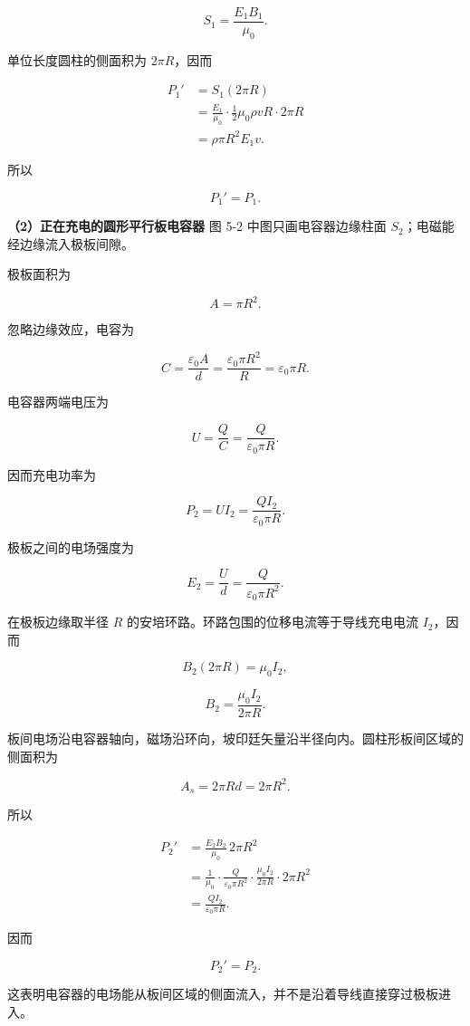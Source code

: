 \documentclass[12pt,a4paper,UTF8]{ctexart}
\begin{document}
\[S_1=\frac{E_1B_1}{\mu_0}.\]

单位长度圆柱的侧面积为 \(2\pi R\)，因而

\[\begin{aligned}
P_1'
&=S_1(2\pi R)\\
&=\frac{E_1}{\mu_0}\cdot\frac12\mu_0\rho vR\cdot2\pi R\\
&=\rho\pi R^2E_1v.
\end{aligned}\]

所以

\[\boxed{P_1'=P_1}.\]

\textbf{（2）正在充电的圆形平行板电容器} 图 5-2 中图只画电容器边缘柱面
\(S_2\)；电磁能经边缘流入极板间隙。

极板面积为

\[A=\pi R^2.\]

忽略边缘效应，电容为

\[C=\frac{\varepsilon_0A}{d}
=\frac{\varepsilon_0\pi R^2}{R}
=\varepsilon_0\pi R.\]

电容器两端电压为

\[U=\frac QC=\frac{Q}{\varepsilon_0\pi R}.\]

因而充电功率为

\[\boxed{P_2=UI_2=\frac{QI_2}{\varepsilon_0\pi R}}.\]

极板之间的电场强度为

\[E_2=\frac U d
=\frac{Q}{\varepsilon_0\pi R^2}.\]

在极板边缘取半径 \(R\) 的安培环路。环路包围的位移电流等于导线充电电流
\(I_2\)，因而

\[B_2(2\pi R)=\mu_0I_2,\]

\[\boxed{B_2=\frac{\mu_0I_2}{2\pi R}}.\]

板间电场沿电容器轴向，磁场沿环向，坡印廷矢量沿半径向内。圆柱形板间区域的侧面积为

\[A_s=2\pi Rd=2\pi R^2.\]

所以

\[\begin{aligned}
P_2'
&=\frac{E_2B_2}{\mu_0}\,2\pi R^2\\
&=\frac1{\mu_0}
\cdot\frac{Q}{\varepsilon_0\pi R^2}
\cdot\frac{\mu_0I_2}{2\pi R}
\cdot2\pi R^2\\
&=\frac{QI_2}{\varepsilon_0\pi R}.
\end{aligned}\]

因而

\[\boxed{P_2'=P_2}.\]

这表明电容器的电场能从板间区域的侧面流入，并不是沿着导线直接穿过极板进入。
\end{document}
